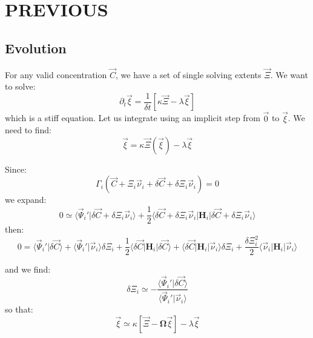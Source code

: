 \documentclass[aps,12pt]{revtex4}
\begin{document}
\section{PREVIOUS}

\subsection{Evolution}

For any valid concentration $\vec{C}$, we have a set of single solving extents $\vec{\Xi}$.
We want to solve:
\begin{equation}
	\partial_t \vec{\xi} = \dfrac{1}{\delta t} \left[ \kappa \vec{\Xi} - \lambda \vec{\xi} \right]
\end{equation}
which is a stiff equation. Let us integrate using an implicit step from $\vec{0}$ to $\vec{\xi}$.
We need to find:
\begin{equation}
	\vec{\xi} = \kappa \vec{\Xi}(\vec{\xi}) - \lambda \vec{\xi}
\end{equation}

Since:
\begin{equation}
	\Gamma_i(\vec{C} + \Xi_i \vec{\nu}_i + \delta\vec{C} + \delta\Xi_i \vec{\nu}_i) = 0
\end{equation}
we expand:
\begin{equation}
	0 \simeq \langle \vec{\Psi}_i' \vert \delta\vec{C} + \delta\Xi_i \vec{\nu}_i \rangle
	+ \dfrac{1}{2} \langle  \delta\vec{C} + \delta\Xi_i \vec{\nu}_i \vert \bm{H}_i \vert  \delta\vec{C} + \delta\Xi_i \vec{\nu}_i\rangle
\end{equation}
then:
\begin{equation}
	0 = \langle \vec{\Psi}_i' \vert \delta\vec{C}\rangle + \langle \vec{\Psi}_i' \vert \vec{\nu}_i \rangle \delta \Xi_i 
	+ \dfrac{1}{2} \langle \delta\vec{C} \vert \bm{H}_i \vert \delta\vec{C} \rangle
	+ \langle \delta\vec{C} \vert \bm{H}_i \vert \vec{\nu}_i \rangle \delta \Xi_i
	+ \dfrac{\delta\Xi_i^2}{2} \langle \vec{\nu}_i \vert \bm{H}_i \vert \vec{\nu}_i \rangle
\end{equation}


and we find:
\begin{equation}
	\delta \Xi_i \simeq - \dfrac{\langle \vec{\Psi}_i' \vert \delta\vec{C}\rangle}{\langle \vec{\Psi}_i' \vert \vec{\nu}_i \rangle}
\end{equation}
so that:
\begin{equation}
	 \vec{\xi} \simeq \kappa \left[ \vec{\Xi} - \bm{\Omega}\vec{\xi} \right] - \lambda \vec{\xi}
\end{equation} 
\end{document}
